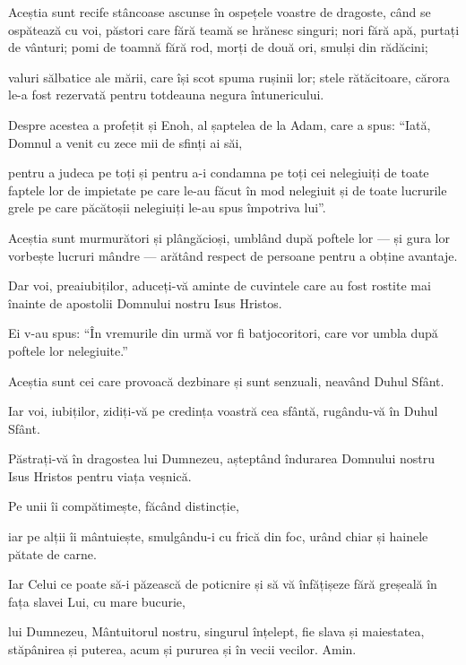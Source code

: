 {Aceștia sunt recife stâncoase ascunse în ospețele voastre de dragoste, când se ospătează cu voi, păstori care fără teamă se hrănesc singuri; nori fără apă, purtați de vânturi; pomi de toamnă fără rod, morți de două ori, smulși din rădăcini;

valuri sălbatice ale mării, care își scot spuma rușinii lor; stele rătăcitoare, cărora le-a fost rezervată pentru totdeauna negura întunericului.

Despre acestea a profețit și Enoh, al șaptelea de la Adam, care a spus: “Iată, Domnul a venit cu zece mii de sfinți ai săi,

pentru a judeca pe toți și pentru a-i condamna pe toți cei nelegiuiți de toate faptele lor de impietate pe care le-au făcut în mod nelegiuit și de toate lucrurile grele pe care păcătoșii nelegiuiți le-au spus împotriva lui”.

Aceștia sunt murmurători și plângăcioși, umblând după poftele lor — și gura lor vorbește lucruri mândre — arătând respect de persoane pentru a obține avantaje.


\par }{\PP {}Dar voi, preaiubiților, aduceți-vă aminte de cuvintele care au fost rostite mai înainte de apostolii Domnului nostru Isus Hristos.

Ei v-au spus: “În vremurile din urmă vor fi batjocoritori, care vor umbla după poftele lor nelegiuite.”

Aceștia sunt cei care provoacă dezbinare și sunt senzuali, neavând Duhul Sfânt.


\par }{\PP {}Iar voi, iubiților, zidiți-vă pe credința voastră cea sfântă, rugându-vă în Duhul Sfânt.

Păstrați-vă în dragostea lui Dumnezeu, așteptând îndurarea Domnului nostru Isus Hristos pentru viața veșnică.

Pe unii îi compătimește, făcând distincție,

iar pe alții îi mântuiește, smulgându-i cu frică din foc, urând chiar și hainele pătate de carne.


\par }{\PP {}Iar Celui ce poate să-i păzească de poticnire și să vă înfățișeze fără greșeală în fața slavei Lui, cu mare bucurie,

lui Dumnezeu, Mântuitorul nostru, singurul înțelept, fie slava și maiestatea, stăpânirea și puterea, acum și pururea și în vecii vecilor. Amin.


\par }